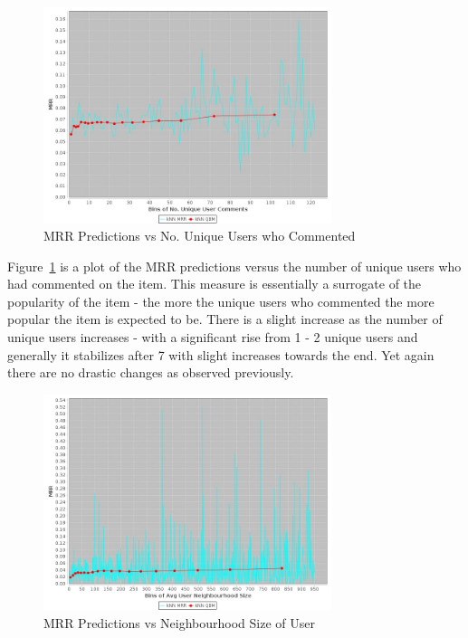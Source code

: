 \begin{figure}[!h]
\centering
\includegraphics[width=0.75\textwidth]{c-inv_images/AuthorshipItemCountMRR.jpeg}
\caption{MRR Predictions vs No. Unique Users who Commented}
\label{fig:AuthorshipItemCountMRR}
\end{figure}

Figure~\ref{fig:AuthorshipItemCountMRR} is a plot of the MRR predictions versus the number of unique users who had commented on the item. This measure is essentially a surrogate of the popularity of the item - the more the unique users who commented the more popular the item is expected to be. There is a slight increase as the number of unique users increases - with a significant rise from 1 - 2 unique users and generally it stabilizes after 7 with slight increases towards the end. Yet again there are no drastic changes as observed previously.


\begin{figure}[!h]
\centering
\includegraphics[width=0.75\textwidth]{c-inv_images/AuthorshipUserNeighMRR.jpeg}
\caption{MRR Predictions vs Neighbourhood Size of User}
\label{fig:AuthorshipUserNeighMRR}
\end{figure}

